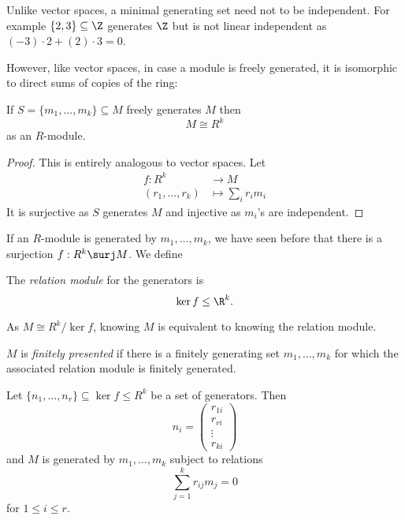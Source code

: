 \documentclass[a4paper]{article}
\theoremstyle{definition}
\begin{document}
\begin{eg}
  Unlike vector spaces, a minimal generating set need not to be independent. For example \(\{2, 3\} \subseteq \Z\) generates \(\Z\) but is not linear independent as \((-3) \cdot 2 + (2) \cdot 3 = 0\).
\end{eg}

However, like vector spaces, in case a module is freely generated, it is isomorphic to direct sums of copies of the ring:

\begin{lemma}
  If \(S = \{m_1, \dots, m_k\} \subseteq M\) freely generates \(M\) then
  \[
    M \cong R^k
  \]
  as an \(R\)-module.
\end{lemma}

\begin{proof}
  This is entirely analogous to vector spaces. Let
  \begin{align*}
    f: R^k &\to M \\
    (r_1, \dots, r_k) &\mapsto \sum_i r_im_i
  \end{align*}
  It is surjective as \(S\) generates \(M\) and injective as \(m_i\)'s are independent.
\end{proof}

If an \(R\)-module is generated by \(m_1, \dots, m_k\), we have seen before that there is a surjection \(f: R^k \surj M\). We define

\begin{definition}
  The \emph{relation module} for the generators is
  \[
    \ker f \leq \R^k.
  \]
\end{definition}

As \(M \cong R^k/\ker f\), knowing \(M\) is equivalent to knowing the relation module.

\begin{definition}
  \(M\) is \emph{finitely presented} if there is a finitely generating set \(m_1, \dots, m_k\) for which the associated relation module is finitely generated.
\end{definition}

Let \(\{n_1, \dots, n_r\} \subseteq \ker f \leq R^k\) be a set of generators. Then
\[
  n_i =
  \begin{pmatrix}
    r_{1i} \\
    r_{ri} \\
    \vdots \\
    r_{ki}
  \end{pmatrix}
\]
and \(M\) is generated by \(m_1, \dots, m_k\) subject to relations
\[
  \sum_{j = 1}^k r_{ij} m_j = 0
\]
for \(1 \leq i\leq r\).
\end{document}
